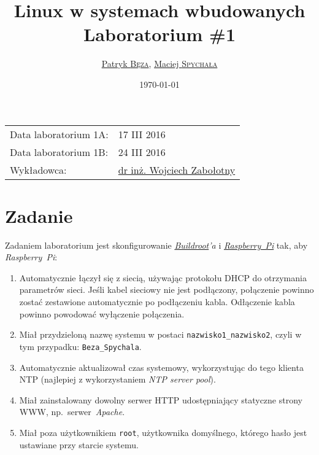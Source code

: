 \documentclass{article}
\title{Linux w systemach wbudowanych\\Laboratorium \#1}
\author{\href{mailto:bezap@student.mini.pw.edu.pl}{Patryk \textsc{Bęza}}, \href{mailto:spychalam@student.mini.pw.edu.pl}{Maciej \textsc{Spychała}}}
\date{\today}
\begin{document}
\maketitle

\begin{center}
\begin{tabular}{ll}
Data laboratorium 1A: & 17 III 2016\\
Data laboratorium 1B: & 24 III 2016\\
Wykładowca: & \href{mailto:wzab@ise.pw.edu.pl}{dr inż. Wojciech Zabołotny}
\end{tabular}
\end{center}



\section{Zadanie}
\label{task}

Zadaniem laboratorium jest skonfigurowanie \emph{\href{https://buildroot.org/}{Buildroot}'a} i \emph{\href{https://www.raspberrypi.org/}{Raspberry~Pi}} tak, aby \emph{Raspberry~Pi}:

\begin{enumerate}
\item Automatycznie łączył się z siecią, używając protokołu DHCP do otrzymania parametrów sieci. Jeśli kabel sieciowy nie jest podłączony, połączenie powinno zostać zestawione automatycznie po podłączeniu kabla. Odłączenie kabla powinno powodować wyłączenie połączenia.
\item Miał przydzieloną nazwę systemu w postaci \texttt{nazwisko1\_nazwisko2}, czyli w tym przypadku: \texttt{Beza\_Spychala}.
\item Automatycznie aktualizował czas systemowy, wykorzystując do tego klienta NTP (najlepiej z wykorzystaniem \emph{NTP server pool}).
\item Miał zainstalowany dowolny serwer HTTP udostępniający statyczne strony WWW, np.~serwer~\emph{Apache}.
\item Miał poza użytkownikiem \texttt{root}, użytkownika domyślnego, którego hasło jest ustawiane przy starcie systemu.
\end{enumerate}

\end{document}
